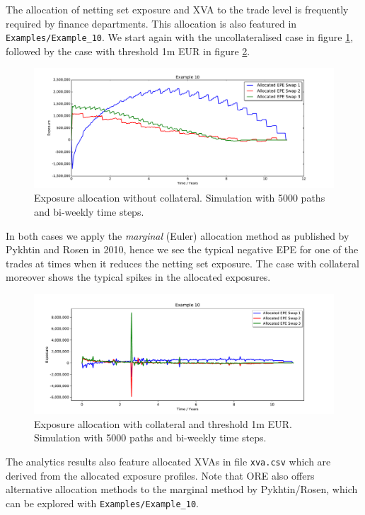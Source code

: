 \documentclass[12pt, a4paper]{article}
\begin{document}
\medskip The allocation of netting set exposure and XVA to the trade level is frequently required by finance
departments. This allocation is also featured in {\tt Examples/Example\_10}. We start again with the uncollateralised
case in figure \ref{fig_12}, followed by the case with threshold 1m EUR in figure \ref{fig_13}.
\begin{figure}[h!]
\begin{center}
\includegraphics[scale=0.45]{mpl_nocollateral_allocated_epe.pdf}
\end{center}
\caption{Exposure allocation without collateral. Simulation with 5000 paths and bi-weekly time steps.}
\label{fig_12}
\end{figure}
In both cases we apply the {\em marginal} (Euler) allocation method as published by Pykhtin and Rosen in 2010, hence we
see the typical negative EPE for one of the trades at times when it reduces the netting set exposure. The case with
collateral moreover shows the typical spikes in the allocated exposures.
\begin{figure}[h!]
\begin{center}
\includegraphics[scale=0.45]{mpl_threshold_allocated_epe.pdf}
\end{center}
\caption{Exposure allocation with collateral and threshold 1m EUR. Simulation with 5000 paths and bi-weekly time steps.}
\label{fig_13}
\end{figure}
The analytics results also feature allocated XVAs in file {\tt xva.csv} which are derived from the allocated exposure
profiles. Note that ORE also offers alternative allocation methods to the marginal method by Pykhtin/Rosen, which can be
explored with {\tt Examples/Example\_10}.
\end{document}
